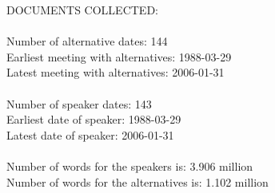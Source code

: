DOCUMENTS COLLECTED:\\\\Number of alternative dates: 	 	 144\\Earliest meeting with alternatives:	 	 1988-03-29 \\Latest meeting with alternatives:	 	 2006-01-31 \\ \\Number of speaker dates: 143\\Earliest date of speaker: 1988-03-29\\Latest date of speaker: 2006-01-31\\\\Number of words for the speakers is: 3.906 million \\Number of words for the alternatives is: 1.102 million \